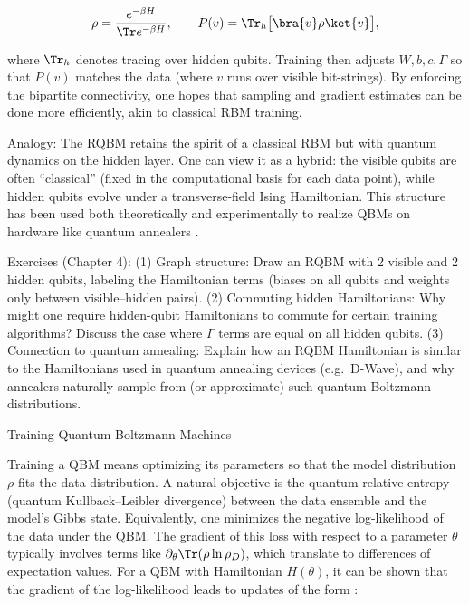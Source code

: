 $$

\rho = \frac{e^{-\beta H}}{\Tr e^{-\beta H}}, \qquad

P(v) = \Tr_{h}\bigl[\bra{v} \rho \ket{v}\bigr],

$$

where $\Tr_h$ denotes tracing over hidden qubits. Training then adjusts ${W,b,c,\Gamma}$ so that $P(v)$ matches the data (where $v$ runs over visible bit-strings). By enforcing the bipartite connectivity, one hopes that sampling and gradient estimates can be done more efficiently, akin to classical RBM training.



Analogy: The RQBM retains the spirit of a classical RBM but with quantum dynamics on the hidden layer. One can view it as a hybrid: the visible qubits are often “classical” (fixed in the computational basis for each data point), while hidden qubits evolve under a transverse-field Ising Hamiltonian. This structure has been used both theoretically and experimentally to realize QBMs on hardware like quantum annealers .



Exercises (Chapter 4): (1) Graph structure: Draw an RQBM with 2 visible and 2 hidden qubits, labeling the Hamiltonian terms (biases on all qubits and weights only between visible–hidden pairs). (2) Commuting hidden Hamiltonians: Why might one require hidden-qubit Hamiltonians to commute for certain training algorithms? Discuss the case where $\Gamma$ terms are equal on all hidden qubits. (3) Connection to quantum annealing: Explain how an RQBM Hamiltonian is similar to the Hamiltonians used in quantum annealing devices (e.g.\ D-Wave), and why annealers naturally sample from (or approximate) such quantum Boltzmann distributions.





Training Quantum Boltzmann Machines





Training a QBM means optimizing its parameters so that the model distribution $\rho$ fits the data distribution. A natural objective is the quantum relative entropy (quantum Kullback–Leibler divergence) between the data ensemble and the model’s Gibbs state. Equivalently, one minimizes the negative log-likelihood of the data under the QBM.  The gradient of this loss with respect to a parameter $\theta$ typically involves terms like $\partial_\theta \Tr(\rho \ln \rho_D)$, which translate to differences of expectation values. For a QBM with Hamiltonian $H(\theta)$, it can be shown that the gradient of the log-likelihood leads to updates of the form :

